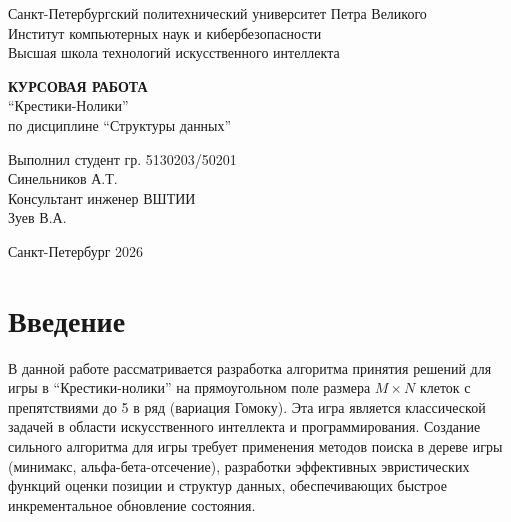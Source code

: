 \documentclass[a4paper,14pt]{extreport}
\begin{document}
\begin{titlepage}
    \begin{center}
        \large Санкт-Петербургский политехнический университет Петра Великого \\
        Институт компьютерных наук и кибербезопасности \\
        Высшая школа технологий искусственного интеллекта
    \end{center}
    \vspace{2cm}
    \begin{center}
        \Large \textbf{КУРСОВАЯ РАБОТА} \\
        \vspace{0.5cm}
        \large ``Крестики-Нолики'' \\
        \vspace{0.5cm}
        \large по дисциплине ``Структуры данных''
    \end{center}
    \vspace{2cm}
    \begin{flushright}
        \large Выполнил студент гр. 5130203/50201 \\
        \underline{\hspace{4cm}} \quad Синельников А.Т. \\
        \vspace{1cm}
        Консультант инженер ВШТИИ \\
        \underline{\hspace{4cm}} \quad Зуев В.А.
    \end{flushright}
    \vfill
    \begin{center}
        \large Санкт-Петербург 2026
    \end{center}
\end{titlepage}

\tableofcontents
\newpage

\chapter*{Введение}
В данной работе рассматривается разработка алгоритма принятия решений для игры в ``Крестики-нолики'' на прямоугольном поле размера $M \times N$ клеток с препятствиями до 5 в ряд (вариация Гомоку). Эта игра является классической задачей в области искусственного интеллекта и программирования. Создание сильного алгоритма для игры требует применения методов поиска в дереве игры (минимакс, альфа-бета-отсечение), разработки эффективных эвристических функций оценки позиции и структур данных, обеспечивающих быстрое инкрементальное обновление состояния.
\end{document}
